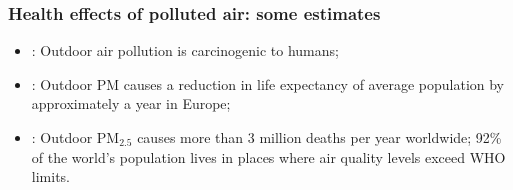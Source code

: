\documentclass[slidestop,compress,serif,10pt]{beamer}
\begin{document}
\begin{frame}
\frametitle{Health effects of polluted air: some estimates}
\vspace{-5pt}
\begin{itemize}
\item \citet{iarc2013}:  Outdoor air pollution is carcinogenic to humans; \vspace{-1pt}
\item \citet{whoeuro2006}: Outdoor  PM causes a reduction in life expectancy of average population by approximately a year in Europe;\vspace{-1pt}
\item \citet{who2016}: Outdoor PM$_{2.5}$ causes more than 3 million deaths per year worldwide; 92\% of the world's population lives in places where air quality levels exceed WHO limits.
 \end{itemize}

\begin{figure}[h]
 \centering
\end{figure}

\end{frame}
\end{document}
